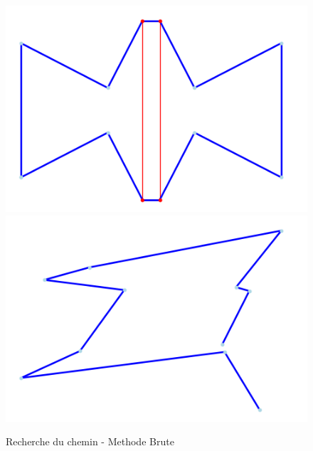 \documentclass{report}
\begin{document}
\begin{figure}
  \centering
  \includegraphics[scale=0.4]{image/Exemple8dechet.png}
  \includegraphics[scale=0.4]{image/Exmple10dechet.png}
  \caption{Recherche du chemin - Methode Brute}
  \label{tsp_dechet}
\end{figure}
\end{document}
